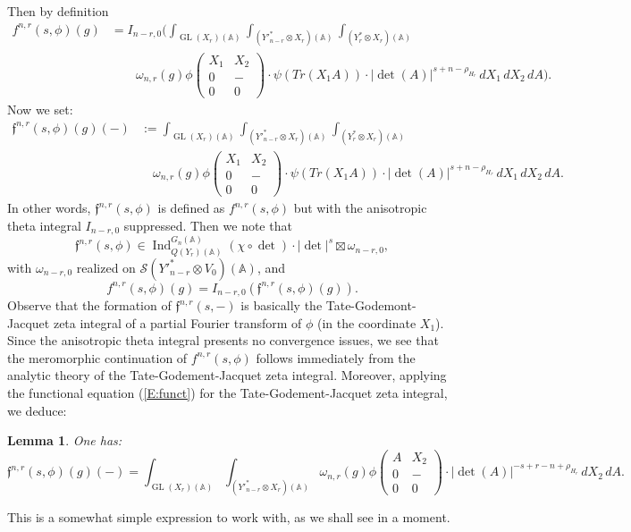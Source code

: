 \documentclass[10pt]{amsart}
\theoremstyle{plain}
\newtheorem{Lem}[equation]{Lemma}
\numberwithin{equation}{section}
\begin{document}
 Then by definition
\begin{align*}
f^{n,r}(s, \phi)(g)  &= 
 I_{n-r,0} \Bigg( \int_{{\operatorname{GL}}(X_r)({\mathbb{A}})}\int_{({Y'}_{n-r}^* \otimes
   X_r)({\mathbb{A}})}\int_{(Y_r^* \otimes X_r)({\mathbb{A}})} \\
&\qquad\omega_{n,r}(g) \phi \begin{pmatrix}
 X_1 & X_2  \\
 0 & - \\
 0 & 0 \end{pmatrix} \cdot \psi(Tr(X_1A) ) \cdot
|\det(A)|^{s+ n - \rho_{H_r}} \, dX_1 \, dX_2 \, dA \Bigg).
\end{align*}
Now we set:
\begin{align*}  \mathfrak{f}^{n,r}(s,\phi)(g)(-)
&:= \int_{{\operatorname{GL}}(X_r)({\mathbb{A}})}\int_{({Y'}_{n-r}^* \otimes X_r)({\mathbb{A}})}\int_{(Y_r^* \otimes X_r)({\mathbb{A}})}\\
&\quad  \omega_{n,r}(g) \phi 
\begin{pmatrix} X_1 & X_2  \\ 0 & - \\0 & 0 \end{pmatrix}
\cdot \psi(Tr(X_1A) ) \cdot |\det(A)|^{s+ n - \rho_{H_r}} \, dX_1 \,
dX_2 \, dA.
\end{align*}
 In other words, $ \mathfrak{f}^{n,r}(s,\phi)$ is defined as
 $f^{n,r}(s,\phi)$ but with the anisotropic theta integral $I_{n-r,0}$
 suppressed. Then we note that
 \[  
  \mathfrak{f}^{n,r}(s,\phi) \in 
{\operatorname{Ind}}^{G_n({\mathbb{A}})}_{Q(Y_r)({\mathbb{A}})}  (\chi \circ \det) \cdot |\det|^s
\boxtimes \omega_{n-r,0}, 
\]
 with $\omega_{n-r,0}$ realized on $\mathcal{S}({Y'}^*_{n-r}\otimes V_0)({\mathbb{A}})$, and
 \begin{equation}\label{E:frak}   
f^{n,r}(s, \phi)(g)  =   I_{n-r,0} \left(\mathfrak{f}^{n,r}(s,
  \phi)(g) \right). 
\end{equation}
 Observe that  the formation of $\mathfrak{f}^{n,r}(s,-)$ is basically
 the Tate-Godemont-Jacquet zeta integral of a partial Fourier
 transform of $\phi$ (in the coordinate $X_1$).
 Since the anisotropic theta integral presents no convergence issues,
 we see that the meromorphic continuation of $f^{n,r}(s,\phi)$ follows
 immediately from the analytic theory of the Tate-Godement-Jacquet
 zeta integral. Moreover, applying the functional equation
 (\ref{E:funct}) for the Tate-Godement-Jacquet zeta integral, we
 deduce:
  \vskip 5pt
  
\begin{Lem} \label{L:tate}
One has:  
\[ 
\mathfrak{f}^{n,r}(s, \phi)(g)(-)=  \int_{{\operatorname{GL}}(X_r)({\mathbb{A}})}
\int_{({Y'}_{n-r}^* \otimes X_r)({\mathbb{A}})} \omega_{n,r}(g)\phi
\begin{pmatrix}
 A & X_2 \\
 0 & - \\
 0 & 0 \end{pmatrix} 
\cdot |\det(A)|^{-s  +r - n + \rho_{H_r}} \, dX_2 \, dA. \]
\end{Lem}
This is a somewhat simple expression to work with, as we shall see in
a moment.
\vskip 10pt
 
\end{document}
